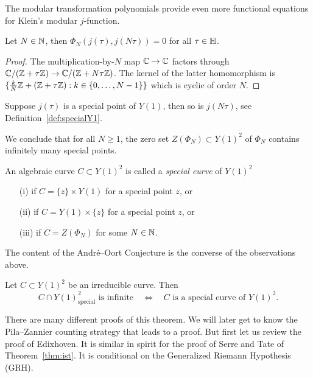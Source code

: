 The modular transformation polynomials provide even more functional
equations for Klein's modular $j$-function. 

\begin{lemma}
  Let $N\in{\mathbb{N}}$, then $\Phi_N(j(\tau),j(N\tau))=0$ for all
  $\tau\in{\mathbb{H}}$. 
\end{lemma}
\begin{proof}
  The multiplication-by-$N$ map ${\mathbb{C}}\rightarrow{\mathbb{C}}$ factors through
  ${\mathbb{C}}/({\mathbb{Z}}+\tau{\mathbb{Z}}) \rightarrow {\mathbb{C}}/({\mathbb{Z}}+N\tau{\mathbb{Z}})$.
  The kernel of the latter homomorphism is $\{\frac kN {\mathbb{Z}}
  +({\mathbb{Z}}+\tau{\mathbb{Z}}) : k\in \{0,\ldots,N-1\}\}$ which is cyclic of order
  $N$.  
\end{proof}

Suppose $j(\tau)$ is a special point of $Y(1)$, then so is $j(N\tau)$,
see Definition~\ref{def:specialY1}.

We conclude that for all $N\ge 1$, the zero set $Z(\Phi_N)\subset
Y(1)^2$ of $\Phi_N$ contains infinitely many special points.

\begin{definition}
  An algebraic curve  $C\subset Y(1)^2$ is called a \emph{special curve} of
  $Y(1)^2$ 
  \begin{enumerate}
  \item [(i)] if $C = \{z\}\times Y(1)$ for a special point $z$, or
  \item [(ii)] if $C =  Y(1)\times \{z\}$ for a special point $z$, or
  \item[(iii)] if $C=Z(\Phi_N)$ for some $N\in{\mathbb{N}}$. 
  \end{enumerate}
\end{definition}

The content of the Andr\'e--Oort Conjecture is the converse of the
observations above.

\begin{theorem}
  \label{thm:ao}
  Let $C\subset Y(1)^2$ be an irreducible curve. Then
  \begin{equation*}
    C \cap Y(1)^2_{\mathrm{special}}\text{ is
      infinite}\quad\Longleftrightarrow\quad \text{$C$ is a special
      curve of $Y(1)^2$}. 
  \end{equation*}  
\end{theorem}

There are many different proofs of this theorem. We will later get to
know the Pila--Zannier counting strategy that leads to a proof.
But first let us review the proof of
Edixhoven. It is similar in spirit for the proof of Serre and Tate of
Theorem~\ref{thm:ist}. It is conditional on the Generalized
Riemann Hypothesis (GRH).

